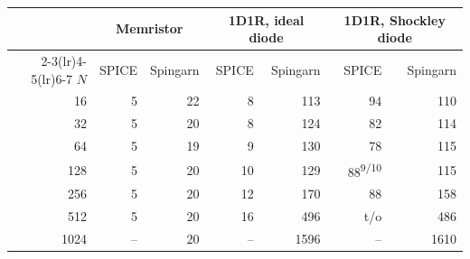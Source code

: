 \begin{tabular}{rrrrrrr}
\toprule
 & \multicolumn{2}{c}{Memristor} & \multicolumn{2}{c}{1D1R, ideal diode} & \multicolumn{2}{c}{1D1R, Shockley diode} \\
\cmidrule(lr){2-3}\cmidrule(lr){4-5}\cmidrule(lr){6-7}
$N$ & SPICE & Spingarn & SPICE & Spingarn & SPICE & Spingarn \\
\midrule
16 & 5 & 22 & 8 & 113 & 94 & 110 \\
32 & 5 & 20 & 8 & 124 & 82 & 114 \\
64 & 5 & 19 & 9 & 130 & 78 & 115 \\
128 & 5 & 20 & 10 & 129 & 88\textsuperscript{9/10} & 115 \\
256 & 5 & 20 & 12 & 170 & 88 & 158 \\
512 & 5 & 20 & 16 & 496 & t/o & 486 \\
1024 & -- & 20 & -- & 1596 & -- & 1610 \\
\bottomrule
\end{tabular}
